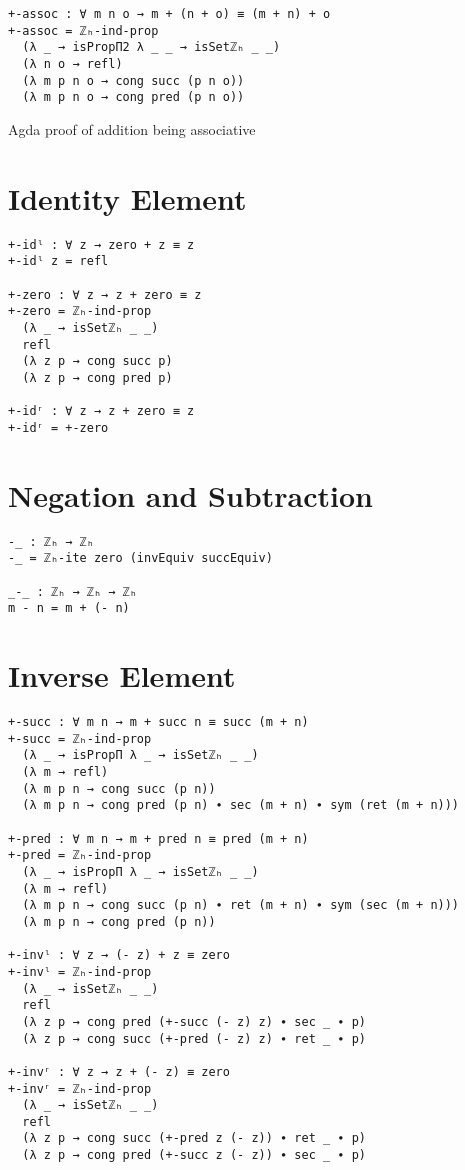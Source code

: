 \begin{listing}[H]
\begin{verbatim}
+-assoc : ∀ m n o → m + (n + o) ≡ (m + n) + o
+-assoc = ℤₕ-ind-prop
  (λ _ → isPropΠ2 λ _ _ → isSetℤₕ _ _)
  (λ n o → refl)
  (λ m p n o → cong succ (p n o))
  (λ m p n o → cong pred (p n o))
\end{verbatim}
\caption{Agda proof of addition being associative}
\end{listing}

\section{Identity Element}
\begin{verbatim}
+-idˡ : ∀ z → zero + z ≡ z
+-idˡ z = refl

+-zero : ∀ z → z + zero ≡ z
+-zero = ℤₕ-ind-prop
  (λ _ → isSetℤₕ _ _)
  refl
  (λ z p → cong succ p)
  (λ z p → cong pred p)

+-idʳ : ∀ z → z + zero ≡ z
+-idʳ = +-zero
\end{verbatim}

\section{Negation and Subtraction}
\begin{verbatim}
-_ : ℤₕ → ℤₕ
-_ = ℤₕ-ite zero (invEquiv succEquiv)

_-_ : ℤₕ → ℤₕ → ℤₕ
m - n = m + (- n)
\end{verbatim}

\section{Inverse Element}
\begin{verbatim}
+-succ : ∀ m n → m + succ n ≡ succ (m + n)
+-succ = ℤₕ-ind-prop
  (λ _ → isPropΠ λ _ → isSetℤₕ _ _)
  (λ m → refl)
  (λ m p n → cong succ (p n))
  (λ m p n → cong pred (p n) ∙ sec (m + n) ∙ sym (ret (m + n)))

+-pred : ∀ m n → m + pred n ≡ pred (m + n)
+-pred = ℤₕ-ind-prop
  (λ _ → isPropΠ λ _ → isSetℤₕ _ _)
  (λ m → refl)
  (λ m p n → cong succ (p n) ∙ ret (m + n) ∙ sym (sec (m + n)))
  (λ m p n → cong pred (p n))

+-invˡ : ∀ z → (- z) + z ≡ zero
+-invˡ = ℤₕ-ind-prop
  (λ _ → isSetℤₕ _ _)
  refl
  (λ z p → cong pred (+-succ (- z) z) ∙ sec _ ∙ p)
  (λ z p → cong succ (+-pred (- z) z) ∙ ret _ ∙ p)

+-invʳ : ∀ z → z + (- z) ≡ zero
+-invʳ = ℤₕ-ind-prop
  (λ _ → isSetℤₕ _ _)
  refl
  (λ z p → cong succ (+-pred z (- z)) ∙ ret _ ∙ p)
  (λ z p → cong pred (+-succ z (- z)) ∙ sec _ ∙ p)
\end{verbatim}

